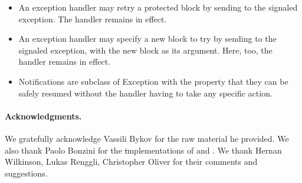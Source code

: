 \documentclass[a4paper,10pt,twoside]{book}
\begin{document}
\begin{itemize}
\item An exception handler may retry a protected block by sending  to the signaled exception. The handler remains in effect.

\item An exception handler may specify a new block to try by sending  to the signaled exception, with the new block as its argument. Here, too, the handler remains in effect.

\item Notifications are subclass of Exception with the property that they can be safely resumed without the handler having to take any specific action.

\end{itemize}

\paragraph{Acknowledgments.}  We gratefully acknowledge Vassili Bykov for the raw material he provided. We also thank Paolo Bonzini for the \st implementations of  and . We thank Hernan Wilkinson, Lukas Renggli, Christopher Oliver for their comments and suggestions.

\ifx\wholebook\relax\else
   
   
\end{document}
